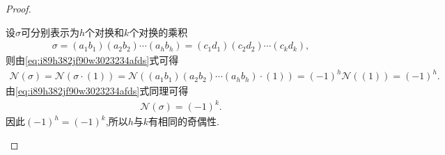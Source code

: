 \documentclass[../../main.tex]{subfiles}%
\begin{document}
\begin{proof}
\begin{enumerate}[(1)]
设$\sigma$可分别表示为$h$个对换和$k$个对换的乘积
\begin{align*}
\sigma = (a_1 b_1)(a_2 b_2)\cdots(a_h b_h) 
= (c_1 d_1)(c_2 d_2)\cdots(c_k d_k),
\end{align*}
则由\eqref{eq:i89h382jf90w3023234afds}式可得
\begin{align*}
\mathcal{N}(\sigma) = \mathcal{N}(\sigma \cdot (1)) 
= \mathcal{N}((a_1 b_1)(a_2 b_2)\cdots(a_h b_h) \cdot (1)) 
= (-1)^h \mathcal{N}((1)) = (-1)^h.
\end{align*}
由\eqref{eq:i89h382jf90w3023234afds}式同理可得
\begin{align*}
\mathcal{N}(\sigma) = (-1)^k.
\end{align*}
因此$(-1)^h = (-1)^k$,所以$h$与$k$有相同的奇偶性.
\end{enumerate}

\end{proof}
\end{document}
